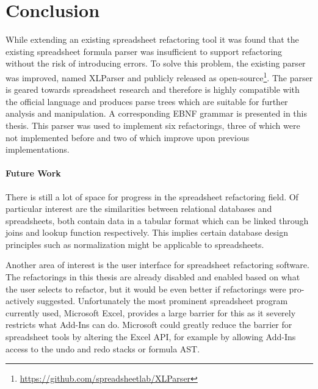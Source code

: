 
\chapter{Conclusion}

While extending an existing spreadsheet refactoring tool it was found that the existing spreadsheet formula parser was insufficient to support refactoring without the risk of introducing errors.
To solve this problem, the existing parser was improved, named XLParser and publicly released as open-source\footnote{\url{https://github.com/spreadsheetlab/XLParser}}.
The parser is geared towards spreadsheet research and therefore is highly compatible with the official language and produces parse trees which are suitable for further analysis and manipulation.
A corresponding EBNF grammar is presented in this thesis.
This parser was used to implement six refactorings, three of which were not implemented before and two of which improve upon previous implementations.

\subsubsection{Future Work}

There is still a lot of space for progress in the spreadsheet refactoring field.
Of particular interest are the similarities between relational databases and spreadsheets, both contain data in a tabular format which can be linked through joins and lookup function respectively.
This implies certain database design principles such as normalization might be applicable to spreadsheets.

Another area of interest is the user interface for spreadsheet refactoring software.
The refactorings in this thesis are already disabled and enabled based on what the user selects to refactor, but it would be even better if refactorings were pro-actively suggested. 
Unfortunately the most prominent spreadsheet program currently used, Microsoft Excel, provides a large barrier for this as it severely restricts what Add-Ins can do.
Microsoft could greatly reduce the barrier for spreadsheet tools by altering the Excel API, for example by allowing Add-Ins access to the undo and redo stacks or formula AST.